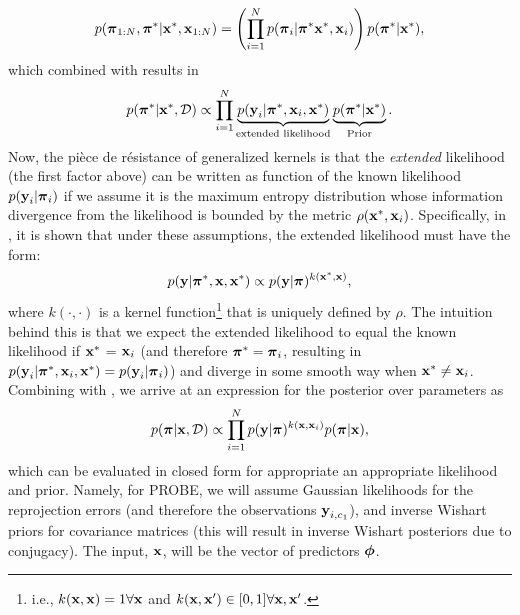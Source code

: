 \begin{equation}
 p(\boldsymbol{\mathbf{\pi}}_{1:N}, \boldsymbol{\mathbf{\pi}}^*| \boldsymbol{\mathbf{x}}^*, \boldsymbol{\mathbf{x}}_{1:N}) = \left( \prod_{i=1}^N  p(\boldsymbol{\mathbf{\pi}}_i | \boldsymbol{\mathbf{\pi}}^* \boldsymbol{\mathbf{x}}^*, \boldsymbol{\mathbf{x}}_i)  \right) p(\boldsymbol{\mathbf{\pi}}^* | \boldsymbol{\mathbf{x}}^*), 
\end{equation}
which combined with  results in
\begin{equation}
\label{eq:probe_extended_likelihood}
p(\boldsymbol{\mathbf{\pi}}^* | \boldsymbol{\mathbf{x}}^*, \mathcal{D}) \propto \prod_{i=1}^N \underbrace{p(\boldsymbol{\mathbf{y}}_i | \boldsymbol{\mathbf{\pi}}^*, \boldsymbol{\mathbf{x}}_i, \boldsymbol{\mathbf{x}}^*)}_{\text{extended likelihood}} \underbrace{p(\boldsymbol{\mathbf{\pi}}^*|\boldsymbol{\mathbf{x}}^*)}_{\text{Prior}}.
\end{equation}
Now, the pièce de résistance of generalized kernels is that the \textit{extended} likelihood (the first factor above) can be written as function of the known likelihood $p(\boldsymbol{\mathbf{y}}_i | \boldsymbol{\mathbf{\pi}}_i)$ if we assume it is the maximum entropy distribution whose information divergence from the likelihood is bounded by the metric $\rho(\boldsymbol{\mathbf{x}}^*, \boldsymbol{\mathbf{x}}_i)$. Specifically, in \cite{Vega-Brown2014-sb}, it is shown that under these assumptions, the extended likelihood must have the form:
\begin{equation}
\label{eq:probe_kernel_likelihood}
p(\boldsymbol{\mathbf{y}} | \boldsymbol{\mathbf{\pi}}^*, \boldsymbol{\mathbf{x}}, \boldsymbol{\mathbf{x}}^*) \propto p(\boldsymbol{\mathbf{y}} | \boldsymbol{\mathbf{\pi}})^{k(\boldsymbol{\mathbf{x}}^*, \boldsymbol{\mathbf{x}})},
\end{equation}
where $k(\cdot, \cdot)$ is a kernel function\footnote{i.e., $k(\boldsymbol{\mathbf{x}}, \boldsymbol{\mathbf{x}}) = 1 \forall \boldsymbol{\mathbf{x}}$ and $k(\boldsymbol{\mathbf{x}}, \boldsymbol{\mathbf{x}}') \in [0,1] \forall \boldsymbol{\mathbf{x}}, \boldsymbol{\mathbf{x}}'$.} that is uniquely defined by $\rho$. The intuition behind this is that we expect the extended likelihood to equal the known likelihood if $\boldsymbol{\mathbf{x}}^*$ = $\boldsymbol{\mathbf{x}}_i$ (and therefore $\boldsymbol{\mathbf{\pi}}^* = \boldsymbol{\mathbf{\pi}}_i$, resulting in $p(\boldsymbol{\mathbf{y}}_i | \boldsymbol{\mathbf{\pi}}^*, \boldsymbol{\mathbf{x}}_i, \boldsymbol{\mathbf{x}}^*) = p(\boldsymbol{\mathbf{y}}_i | \boldsymbol{\mathbf{\pi}}_i)$) and diverge in some smooth way when $\boldsymbol{\mathbf{x}}^* \neq \boldsymbol{\mathbf{x}}_i$. 
Combining  with , we arrive at an expression for the posterior over parameters as 
\begin{equation}
\label{eq:probe_posterior}
p(\boldsymbol{\mathbf{\pi}} | \boldsymbol{\mathbf{x}}, \mathcal{D}) \propto \prod_{i=1}^N p(\boldsymbol{\mathbf{y}} | \boldsymbol{\mathbf{\pi}})^{k(\boldsymbol{\mathbf{x}}, \boldsymbol{\mathbf{x}}_i)} p(\boldsymbol{\mathbf{\pi}} |\boldsymbol{\mathbf{x}}),
\end{equation}
which can be evaluated in closed form for appropriate an appropriate likelihood and prior. Namely, for PROBE, we will assume Gaussian likelihoods for the reprojection errors (and therefore the observations $\boldsymbol{\mathbf{y}}_{i, c_1}$), and inverse Wishart priors for covariance matrices (this will result in inverse Wishart posteriors due to conjugacy). The input, $\boldsymbol{\mathbf{x}}$, will be the vector of predictors $\boldsymbol{\mathbf{\phi}}$.




